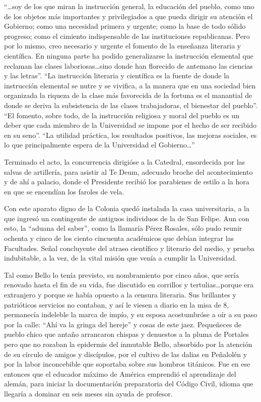 \documentclass[10pt,twoside,openright]{memoir}
\begin{document}
``\ldots{}soy de los que miran la instrucción general, la educación del
pueblo, como uno de los objetos más importantes y privilegiados a que
pueda dirigir su atención el Gobierno; como una necesidad primera y
urgente; como la base de todo sólido progreso; como el cimiento
indispensable de las instituciones republicanas. Pero por lo mismo, creo
necesario y urgente el fomento de la enseñanza literaria y científica.
En ninguna parte ha podido generalizarse la instrucción elemental que
reclaman las clases laboriosas\ldots sino donde han florecido de antemano
las ciencias y las letras''. ``La instrucción literaria y científica es la
fuente de donde la instrucción elemental se nutre y se vivifica, a la
manera que en una sociedad bien organizada la riqueza de la clase más
favorecida de la fortuna es el manantial de donde se deriva la
subsistencia de las clases trabajadoras, el bienestar del pueblo''. ``El
fomento, sobre todo, de la instrucción religiosa y moral del pueblo es
un deber que cada miembro de la Universidad se impone por el hecho de
ser recibido en su seno''. ``La utilidad práctica, los resultados
positivos, las mejoras sociales, es lo que principalmente espera de la
Universidad el Gobierno\ldots''

Terminado el acto, la concurrencia dirigióse a la Catedral, ensordecida
por las salvas de artillería, para asistir al Te Deum, adecuado broche
del acontecimiento y de ahí a palacio, donde el Presidente recibió los
parabienes de estilo a la hora en que se encendían los faroles de vela.

Con este aparato digno de la Colonia quedó instalada la casa
universitaria, a la que ingresó un contingente de antiguos individuos de
la de San Felipe. Aun con esto, la ``aduana del saber'', como la llamaría
Pérez Rosales, sólo pudo reunir ochenta y cinco de los ciento cincuenta
académicos que debían integrar las Facultades. Señal concluyente del
atraso científico y literario del medio, y prueba indubitable, a la vez,
de la vital misión que venía a cumplir la Universidad.

Tal como Bello lo tenía previsto, su nombramiento por cinco años, que
sería renovado hasta el fin de su vida, fue discutido en corrillos y
tertulias\ldots porque era extranjero y porque se había opuesto a la
censura literaria. Sus brillantes y patrióticos servicios no contaban, y
así le viesen a diario en la misa de 8, permanecía indeleble la marca de
impío, y su esposa acostumbróse a oír a su paso por la calle: ``Ahí va la
gringa del hereje'' y cosas de este jaez. Pequeñeces de pueblo chico que
antaño arrancaron chispas y denuestos a la pluma de Portales pero que no
rozaban la epidermis del inmutable Bello, absorbido por la atención de
su círculo de amigos y discípulos, por el cultivo de las dalias en
Peñalolén y por la labor inconcebible que soportaba sobre sus hombros
titánicos. Fue en ese entonces que el educador máximo de América
emprendió el aprendizaje del alemán, para iniciar la documentación
preparatoria del Código Civil, idioma que llegaría a dominar en seis
meses sin ayuda de profesor.
\end{document}
